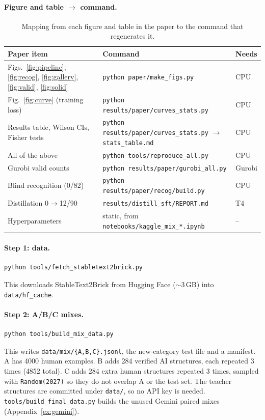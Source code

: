 \paragraph{Figure and table $\to$ command.}
\begin{table}[h]
\centering\small
\caption{Mapping from each figure and table in the paper to the command that regenerates it.}
\label{tab:repro}
\begin{tabularx}{\linewidth}{@{}>{\raggedright\arraybackslash}p{3.7cm}>{\raggedright\arraybackslash}X l@{}}
\toprule
Paper item & Command & Needs \\
\midrule
Figs.~\ref{fig:pipeline}, \ref{fig:recog}, \ref{fig:gallery}, \ref{fig:valid}, \ref{fig:solid} & \texttt{python paper/make\_figs.py} & CPU \\
Fig.~\ref{fig:curve} (training loss) & \texttt{python results/paper/curves\_stats.py} & CPU \\
Results table, Wilson CIs, Fisher tests & \texttt{python results/paper/curves\_stats.py} $\to$ \texttt{stats\_table.md} & CPU \\
All of the above & \texttt{python tools/reproduce\_all.py} & CPU \\
Gurobi valid counts & \texttt{python results/paper/gurobi\_all.py} & Gurobi \\
Blind recognition (0/82) & \texttt{python results/paper/recog/build.py} & CPU \\
Distillation 0$\to$12/90 & \texttt{results/distill\_sft/REPORT.md} & T4 \\
Hyperparameters & static, from \texttt{notebooks/kaggle\_mix\_*.ipynb} & -- \\
\bottomrule
\end{tabularx}
\end{table}

\paragraph{Step 1: data.}
{\small
\begin{verbatim}
python tools/fetch_stabletext2brick.py
\end{verbatim}}
\noindent This downloads StableText2Brick from Hugging Face ($\sim$3\,GB) into \texttt{data/hf\_cache}.

\paragraph{Step 2: A/B/C mixes.}
{\small
\begin{verbatim}
python tools/build_mix_data.py
\end{verbatim}}
\noindent This writes \texttt{data/mix/\{A,B,C\}.jsonl}, the new-category test file and a manifest. A has 4000 human examples. B adds 284 verified AI structures, each repeated 3 times (4852 total). C adds 284 extra human structures repeated 3 times, sampled with \texttt{Random(2027)} so they do not overlap A or the test set. The teacher structures are committed under \texttt{data/}, so no API key is needed. \texttt{tools/build\_final\_data.py} builds the unused Gemini paired mixes (Appendix~\ref{ex:gemini}).

